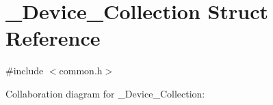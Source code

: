 \hypertarget{struct__Device__Collection}{}\section{\+\_\+\+Device\+\_\+\+Collection Struct Reference}
\label{struct__Device__Collection}


{\ttfamily \#include $<$common.\+h$>$}



Collaboration diagram for \+\_\+\+Device\+\_\+\+Collection\+:
